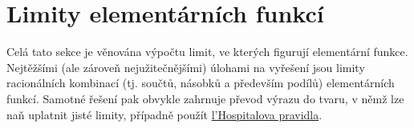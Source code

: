 \section{Limity elementárních funkcí}
\label{sec:limity-elementarnich-funkci}

Celá tato sekce je věnována výpočtu limit, ve kterých figurují elementární
funkce. Nejtěžšími (ale zároveň nejužitečnějšími) úlohami na vyřešení jsou
limity racionálních kombinací (tj. součtů, násobků a především podílů)
elementárních funkcí. Samotné řešení pak obvykle zahrnuje převod výrazu do
tvaru, v němž lze naň uplatnit jisté  limity, případně použít
\hyperref[thm:lhospital]{l'Hospitalova pravidla}.


